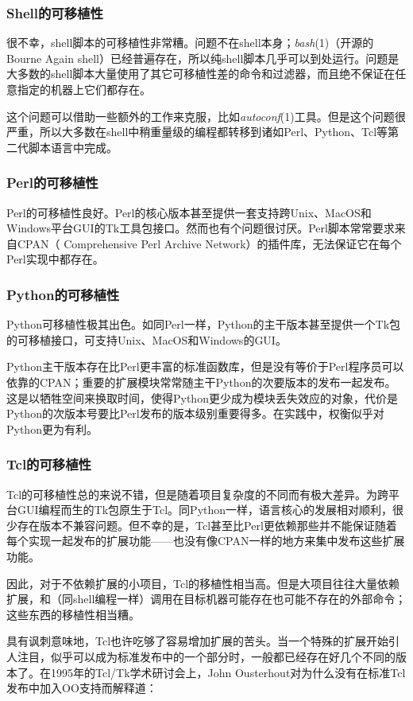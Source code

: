 \documentclass[12pt,oneside]{book}
\begin{document}
\subsubsection{Shell的可移植性}
很不幸，shell脚本的可移植性非常糟。问题不在shell本身；\textit{bash}(1)（开源的Bourne Again shell）已经普遍存在，所以纯shell脚本几乎可以到处运行。问题是大多数的shell脚本大量使用了其它可移植性差的命令和过滤器，而且绝不保证在任意指定的机器上它们都存在。

这个问题可以借助一些额外的工作来克服，比如\textit{autoconf}(1)工具。但是这个问题很严重，所以大多数在shell中稍重量级的编程都转移到诸如Perl、Python、Tcl等第二代脚本语言中完成。

\subsubsection{Perl的可移植性}
Perl的可移植性良好。Perl的核心版本甚至提供一套支持跨Unix、MacOS和Windows平台GUI的Tk工具包接口。然而也有个问题很讨厌。Perl脚本常常要求来自CPAN（ Comprehensive Perl Archive Network）的插件库，无法保证它在每个Perl实现中都存在。

\subsubsection{Python的可移植性}
Python可移植性极其出色。如同Perl一样，Python的主干版本甚至提供一个Tk包的可移植接口，可支持Unix、MacOS和Windows的GUI。

Python主干版本存在比Perl更丰富的标准函数库，但是没有等价于Perl程序员可以依靠的CPAN；重要的扩展模块常常随主干Python的次要版本的发布一起发布。这是以牺牲空间来换取时间，使得Python更少成为模块丢失效应的对象，代价是Python的次版本号要比Perl发布的版本级别重要得多。在实践中，权衡似乎对Python更为有利。

\subsubsection{Tcl的可移植性}
Tcl的可移植性总的来说不错，但是随着项目复杂度的不同而有极大差异。为跨平台GUI编程而生的Tk包原生于Tcl。同Python一样，语言核心的发展相对顺利，很少存在版本不兼容问题。但不幸的是，Tcl甚至比Perl更依赖那些并不能保证随着每个实现一起发布的扩展功能——也没有像CPAN一样的地方来集中发布这些扩展功能。

因此，对于不依赖扩展的小项目，Tcl的移植性相当高。但是大项目往往大量依赖扩展，和（同shell编程一样）调用在目标机器可能存在也可能不存在的外部命令；这些东西的移植性相当糟。

具有讽刺意味地，Tcl也许吃够了容易增加扩展的苦头。当一个特殊的扩展开始引人注目，似乎可以成为标准发布中的一个部分时，一般都已经存在好几个不同的版本了。在1995年的Tcl/Tk学术研讨会上，John Ousterhout对为什么没有在标准Tcl发布中加入OO支持而解释道：
\end{document}
